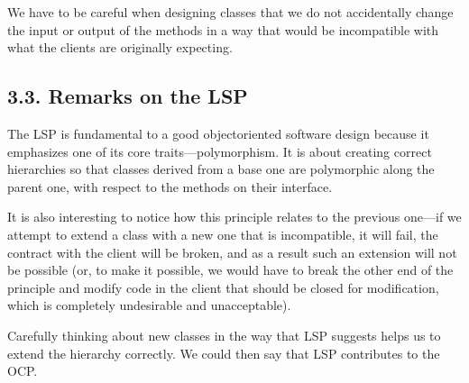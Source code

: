 \documentclass[a4paper,10pt,english]{sphinxmanual}
\begin{document}
\begin{sphinxVerbatim}[commandchars=\\\{\}]
      
\end{sphinxVerbatim}

We have to be careful when designing classes that we do
not accidentally change the input or output of the methods in a way that would be
incompatible with what the clients are originally expecting.


\subsection{3.3. Remarks on the LSP}
\label{\detokenize{chapters/4_solid_principles/index:remarks-on-the-lsp}}
The LSP is fundamental to a good object\sphinxhyphen{}oriented software design because it emphasizes
one of its core traits—polymorphism. It is about creating correct hierarchies so that classes
derived from a base one are polymorphic along the parent one, with respect to the methods
on their interface.

It is also interesting to notice how this principle relates to the previous one—if we attempt
to extend a class with a new one that is incompatible, it will fail, the contract with the client
will be broken, and as a result such an extension will not be possible (or, to make it
possible, we would have to break the other end of the principle and modify code in the
client that should be closed for modification, which is completely undesirable and
unacceptable).

Carefully thinking about new classes in the way that LSP suggests helps us to extend the
hierarchy correctly. We could then say that LSP contributes to the OCP.
\end{document}
